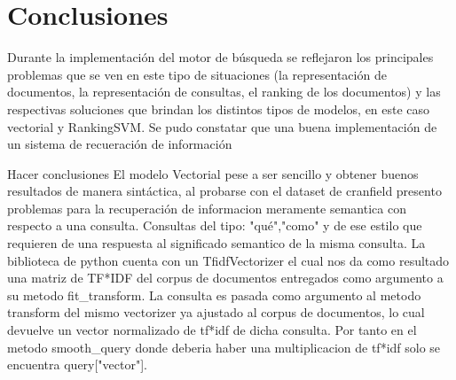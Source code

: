 \documentclass[runningheads]{llncs}
\begin{document}
\section{Conclusiones}

Durante la implementación del motor de búsqueda se reflejaron los principales problemas que se
ven en este tipo de situaciones (la representación de documentos, la representación de consultas, 
el ranking de los documentos) y las respectivas soluciones que brindan los distintos tipos de modelos,
en este caso vectorial y RankingSVM. Se pudo constatar que una buena implementación de un sistema de recueración
de información

Hacer conclusiones
El modelo Vectorial pese a ser sencillo y obtener buenos resultados de manera sintáctica, al probarse con el dataset de cranfield
presento problemas para la recuperación de informacion meramente semantica con respecto a una consulta. Consultas del tipo: "qué","como" 
y de ese estilo que requieren de una respuesta al significado semantico de la misma consulta.
La biblioteca de python cuenta con un TfidfVectorizer el cual nos da como resultado una matriz de TF*IDF del corpus de documentos
entregados como argumento a su metodo fit\_transform.
La consulta es pasada como argumento al metodo transform del mismo vectorizer ya ajustado al corpus de documentos, lo cual devuelve un
 vector normalizado de tf*idf de dicha consulta. Por tanto en el metodo smooth\_query donde deberia haber una multiplicacion de tf*idf 
 solo se encuentra query["vector"]. 




\end{document}
